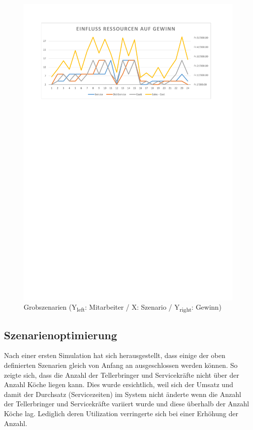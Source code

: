 \documentclass[ngerman,a4paper,12pt]{scrreprt}
\begin{document}
		\begin{figure}[H]
			\centering
				\includegraphics[trim=2cm 22.75cm 2cm 2cm, clip=true,width=\textwidth]{../Auswertung/1_groberOptimumBereich.pdf}
				\caption[Grobszenarien]{Grobszenarien (Y\textsubscript{left}: Mitarbeiter / X: Szenario / Y\textsubscript{right}: Gewinn)}
				\label{grobszenarien}
		\end{figure}
		
			
		\subsection{Szenarienoptimierung}
		Nach einer ersten Simulation hat sich herausgestellt, dass einige der oben definierten Szenarien gleich von Anfang an ausgeschlossen werden können. So zeigte sich, dass die Anzahl der Tellerbringer und Servicekräfte nicht über der Anzahl Köche liegen kann. Dies wurde ersichtlich, weil sich der Umsatz und damit der Durchsatz (Servicezeiten) im System nicht änderte wenn die Anzahl der Tellerbringer und Servicekräfte variiert wurde und diese überhalb der Anzahl Köche lag. Lediglich deren Utilization verringerte sich bei einer Erhöhung der Anzahl.
		 
\end{document}
